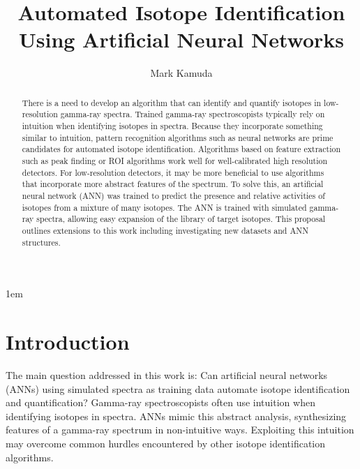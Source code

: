 \documentclass[tocnosub,noragright,centerchapter,12pt,fullpage]{uiucecethesis09}
\title{Automated Isotope Identification Using Artificial Neural Networks}
\author{Mark Kamuda}
\begin{document}
%

%
\maketitle

\parindent 1em%

\frontmatter


\begin{abstract}


There is a need to develop an algorithm that can identify and quantify isotopes in low-resolution gamma-ray spectra. Trained gamma-ray spectroscopists typically rely on intuition when identifying isotopes in spectra. Because they incorporate something similar to intuition, pattern recognition algorithms such as neural networks are prime candidates for automated isotope identification. Algorithms based on feature extraction such as peak finding or ROI algorithms work well for well-calibrated high resolution detectors. For low-resolution detectors, it may be more beneficial to use algorithms that incorporate more abstract features of the spectrum. To solve this, an artificial neural network (ANN) was trained to predict the presence and relative activities of isotopes from a mixture of many isotopes. The ANN is trained with simulated gamma-ray spectra, allowing easy expansion of the library of target isotopes. This proposal outlines extensions to this work including investigating new datasets and ANN structures.

\end{abstract}

\tableofcontents

\listoftables

\listoffigures

\mainmatter


\chapter{Introduction}

The main question addressed in this work is: Can artificial neural networks (ANNs) using simulated spectra as training data automate isotope identification and quantification? Gamma-ray spectroscopists often use intuition when identifying isotopes in spectra. ANNs mimic this abstract analysis, synthesizing features of a gamma-ray spectrum in non-intuitive ways. Exploiting this intuition may overcome common hurdles encountered by other isotope identification algorithms. 
\end{document}
